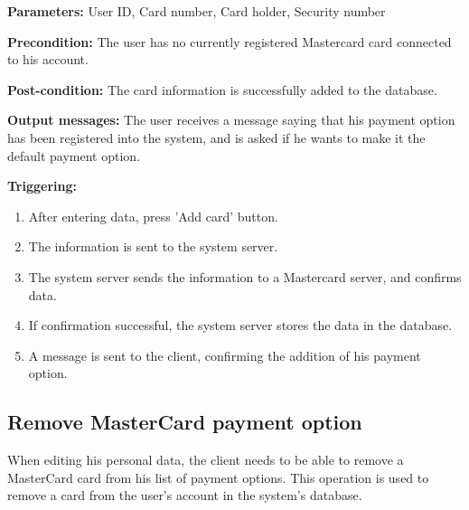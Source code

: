 \begin{description}

\item \textbf{Parameters:} User ID, Card number, Card holder, Security number

\item \textbf{Precondition:} The user has no currently registered Mastercard
card connected to his account.

\item \textbf{Post-condition:} The card information is successfully added to the
database.

\item \textbf{Output messages:} The user receives a message saying that his
payment option has been registered into the system, and is asked if he wants to
make it the default payment option.

\item \textbf{Triggering:}
\begin{enumerate}
\item After entering data, press 'Add card' button.

\item The information is sent to the system server.

\item The system server sends the information to a Mastercard server, and
confirms data.

\item If confirmation successful, the system server stores the data in the
database.

\item A message is sent to the client, confirming the addition of his payment
option.

\end{enumerate}

\end{description}
\subsection{Remove MasterCard payment option}

 When editing his personal data, the client needs to be
 able to remove a MasterCard card from his list of payment options. This operation is
 used to remove a card from the user's account in the system's database.

